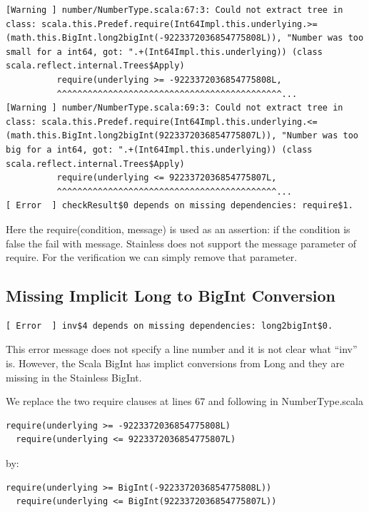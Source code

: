 \documentclass[runningheads]{llncs}
\begin{document}
\begin{lstlisting}[style=stainless]
[Warning ] number/NumberType.scala:67:3: Could not extract tree in class: scala.this.Predef.require(Int64Impl.this.underlying.>=(math.this.BigInt.long2bigInt(-9223372036854775808L)), "Number was too small for a int64, got: ".+(Int64Impl.this.underlying)) (class scala.reflect.internal.Trees$Apply)
          require(underlying >= -9223372036854775808L,
          ^^^^^^^^^^^^^^^^^^^^^^^^^^^^^^^^^^^^^^^^^^^^...
[Warning ] number/NumberType.scala:69:3: Could not extract tree in class: scala.this.Predef.require(Int64Impl.this.underlying.<=(math.this.BigInt.long2bigInt(9223372036854775807L)), "Number was too big for a int64, got: ".+(Int64Impl.this.underlying)) (class scala.reflect.internal.Trees$Apply)
          require(underlying <= 9223372036854775807L,
          ^^^^^^^^^^^^^^^^^^^^^^^^^^^^^^^^^^^^^^^^^^^...
[ Error  ] checkResult$0 depends on missing dependencies: require$1.
\end{lstlisting}

Here the require(condition, message) is used as an assertion: if the
condition is false the fail with message.  Stainless does not support
the message parameter of require.  For the verification we can simply
remove that parameter.



\subsection{Missing Implicit Long to BigInt Conversion}

\begin{lstlisting}[style=stainless]
[ Error  ] inv$4 depends on missing dependencies: long2bigInt$0.
\end{lstlisting}

This error message does not specify a line number and it is not clear
what ``inv'' is. However, the Scala BigInt has implict conversions
from Long and they are missing in the Stainless BigInt.



We replace the two require clauses at lines 67 and following in NumberType.scala

\begin{lstlisting}[style=scala]
  require(underlying >= -9223372036854775808L)
  require(underlying <= 9223372036854775807L)
\end{lstlisting}

by:
\begin{lstlisting}[style=scala]
  require(underlying >= BigInt(-9223372036854775808L))
  require(underlying <= BigInt(9223372036854775807L))
\end{lstlisting}
\end{document}
